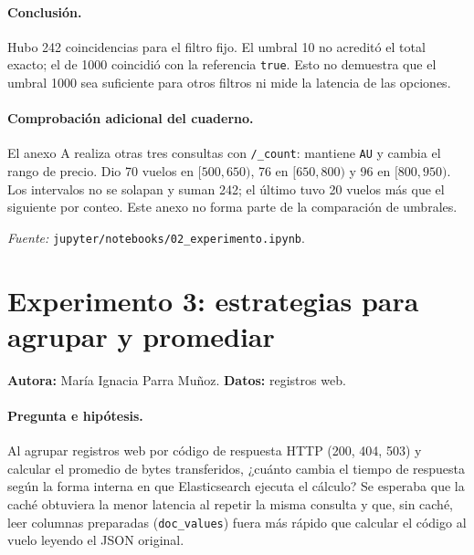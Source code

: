 \documentclass[11pt,a4paper]{article}
\newcommand{\codigo}[1]{\texttt{#1}}
\newcommand{\fuente}[1]{\par\smallskip\noindent\textit{Fuente:} #1\par}
\begin{document}
\paragraph{Conclusión.}
Hubo 242 coincidencias para el filtro fijo. El umbral 10 no acreditó el
total exacto; el de 1000 coincidió con la referencia \codigo{true}.
Esto no demuestra que el umbral 1000 sea suficiente para otros filtros
ni mide la latencia de las opciones.

\paragraph{Comprobación adicional del cuaderno.}
El anexo A realiza otras tres consultas con \codigo{/\_count}: mantiene
\codigo{AU} y cambia el rango de precio. Dio 70 vuelos en $[500,650)$,
76 en $[650,800)$ y 96 en $[800,950)$. Los intervalos no se solapan y
suman 242; el último tuvo 20 vuelos más que el siguiente por conteo.
Este anexo no forma parte de la comparación de umbrales.
\fuente{\nolinkurl{jupyter/notebooks/02_experimento.ipynb}.}

\clearpage
\section{Experimento 3: estrategias para agrupar y promediar}
\textbf{Autora:} María Ignacia Parra Muñoz. \textbf{Datos:} registros web.

\paragraph{Pregunta e hipótesis.}
Al agrupar registros web por código de respuesta HTTP (200, 404, 503)
y calcular el promedio de bytes transferidos, ¿cuánto cambia el tiempo de
respuesta según la forma interna en que Elasticsearch ejecuta el cálculo?
Se esperaba que la caché obtuviera la menor latencia al repetir la misma
consulta y que, sin caché, leer columnas preparadas (\codigo{doc\_values})
fuera más rápido que calcular el código al vuelo leyendo el JSON original.
\end{document}
